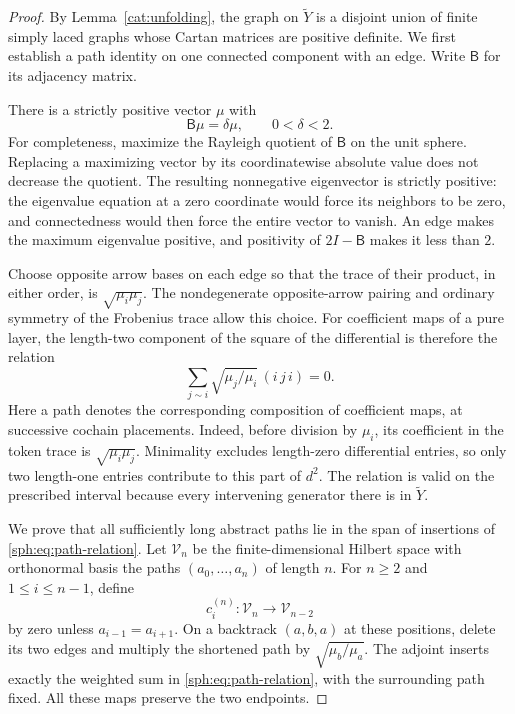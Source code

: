\begin{proof}
By Lemma~\ref{cat:unfolding}, the graph on \(\widetilde Y\)
is a disjoint union of finite simply laced graphs whose Cartan
matrices are positive definite.  We first establish a path
identity on one connected component with an edge.
Write \(\mathsf B\) for its adjacency matrix.

There is a strictly positive vector \(\mu\) with
\[
 \mathsf B\mu=\delta\mu,\qquad 0<\delta<2.
\]
For completeness, maximize the Rayleigh quotient of
\(\mathsf B\) on the unit sphere.  Replacing a maximizing
vector by its coordinatewise absolute value does not decrease
the quotient.  The resulting nonnegative eigenvector is
strictly positive: the eigenvalue equation at a zero coordinate
would force its neighbors to be zero, and connectedness would
then force the entire vector to vanish.  An edge makes the
maximum eigenvalue positive, and positivity of
\(2I-\mathsf B\) makes it less than \(2\).

Choose opposite arrow bases on each edge so that the trace
of their product, in either order, is
\(\sqrt{\mu_i\mu_j}\).  The nondegenerate opposite-arrow pairing
and ordinary symmetry of the Frobenius trace allow this choice.
For coefficient maps of a pure layer, the length-two component
of the square of the differential is therefore the relation
\begin{equation}\label{sph:eq:path-relation}
 \sum_{j\sim i}\sqrt{\mu_j/\mu_i}\,(i\,j\,i)=0.
\end{equation}
Here a path denotes the corresponding composition of coefficient
maps, at successive cochain placements.  Indeed, before division
by \(\mu_i\), its coefficient in the token trace is
\(\sqrt{\mu_i\mu_j}\).  Minimality excludes length-zero
differential entries, so only two length-one entries contribute
to this part of \(d^2\).  The relation is valid on the prescribed
interval because every intervening generator there is in
\(\widetilde Y\).

We prove that all sufficiently long abstract paths lie in the
span of insertions of \eqref{sph:eq:path-relation}.
Let \(\mathcal V_n\) be the finite-dimensional Hilbert space
with orthonormal basis the paths \((a_0,\ldots,a_n)\) of length
\(n\).  For \(n\geq2\) and \(1\leq i\leq n-1\), define
\[
 c_i^{(n)}:\mathcal V_n\longrightarrow\mathcal V_{n-2}
\]
by zero unless \(a_{i-1}=a_{i+1}\).  On a backtrack
\((a,b,a)\) at these positions, delete its two edges and
multiply the shortened path by \(\sqrt{\mu_b/\mu_a}\).
The adjoint inserts exactly the weighted sum in
\eqref{sph:eq:path-relation}, with the surrounding path fixed.
All these maps preserve the two endpoints.


\end{proof}
